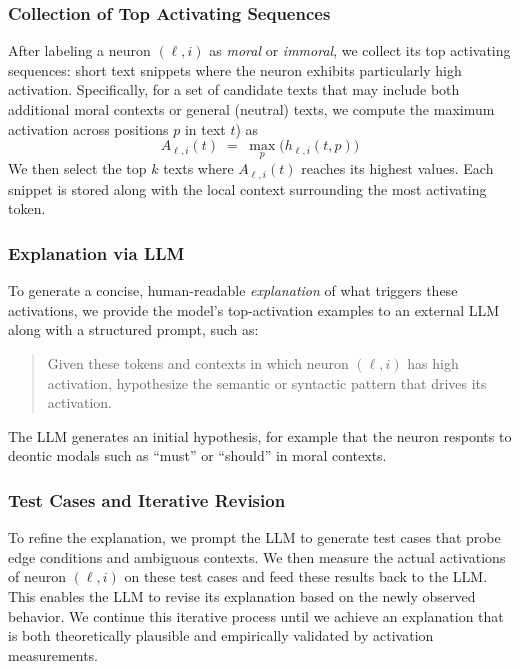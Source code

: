 \documentclass[runninghheads]{llncs}
\newcommand{\qq}[1]{``#1''}  %
\begin{document}
\subsubsection{Collection of Top Activating Sequences}

After labeling a neuron \((\ell, i)\) as \emph{moral} or \emph{immoral}, we collect its top activating sequences: short text snippets where the neuron exhibits particularly high activation. Specifically, for a set of candidate texts that may include both additional moral contexts or general (neutral) texts, we compute the maximum activation across positions $p$ in text \(t\)) as
\[
A_{\ell, i}(t) \;=\; \max_{p} \bigl(h_{\ell,i}(t,p)\bigr)
\]
We then select the top \(k\) texts where \(A_{\ell, i}(t)\) reaches its highest values. Each snippet is stored along with the local context surrounding the most activating token.

\subsubsection{Explanation via LLM}
To generate a concise, human-readable \emph{explanation} of what triggers these activations, we provide the model’s top-activation examples to an external LLM along with a structured prompt, such as:

\begin{quote}
    Given these tokens and contexts in which neuron \((\ell,i)\) has high activation, hypothesize the semantic or syntactic pattern that drives its activation.
\end{quote}

The LLM generates an initial hypothesis, for example that the neuron responts to deontic modals such as \qq{must} or \qq{should} in moral contexts.



\subsubsection{Test Cases and Iterative Revision}
To refine the explanation, we prompt the LLM to generate test cases that probe edge conditions and ambiguous contexts. We then measure the actual activations of neuron \((\ell,i)\)  on these test cases and feed these results back to the LLM. 
This enables the LLM to revise its explanation based on the newly observed behavior. 
We continue this iterative process until we achieve an explanation that is both theoretically plausible and empirically validated by activation measurements.
\end{document}
